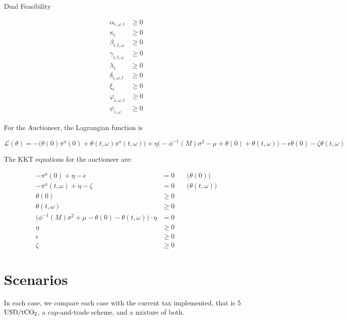 \documentclass[11pt, letterpaper]{article}
\begin{document}
\begin{flushleft}
Dual Feasibility
\end{flushleft}

\begin{align}
    \alpha_{i,\omega,t} & \geq 0 \\
    \kappa_i & \geq 0 \\
    \beta_{i,t,\omega} & \geq 0 \\
    \gamma_{i,t,\omega} & \geq 0 \\
    \lambda_i & \geq 0 \\
    \delta_{i,\omega,t} & \geq 0 \\
    \xi_i & \geq 0 \\
    \varphi_{i,\omega,t} & \geq 0 \\
    \psi_{i,\omega} & \geq 0
\end{align}

For the Auctioneer, the Lagrangian function is 

\begin{equation}
    \mathcal{L}(\theta)=  -\Big(\theta(0)\pi^a(0)+\theta(t,\omega) \pi^{a}(t,\omega)\Big) + \eta \big(-\phi^{-1}(M) \sigma^2 - \mu + \theta(0)+\theta(t,\omega)\big) - \epsilon \theta(0)-\zeta \theta(t,\omega)
\end{equation}

The KKT equations for the auctioneer are:

\begin{align}
    -\pi^{a}(0) +\eta -\epsilon & = 0 & \quad \big(\theta(0)\big)\\
    -\pi^a(t,\omega)+\eta-\zeta & = 0 & \quad \big(\theta(t,\omega)\big)\\
    \theta(0) & \geq  0 \\
    \theta(t,\omega) & \geq  0 \\
    \Big(\phi^{-1}(M) \sigma^2 + \mu - \theta(0)-\theta(t,\omega)\Big)\cdot \eta & =  0\\
    \eta & \geq  0\\
    \epsilon & \geq 0 \\
    \zeta & \geq 0
\end{align}

\section{Scenarios}
In each case, we compare each case with the current tax implemented, that is 5 $\rm USD/tCO_2$, a cap-and-trade scheme, and a mixture of both. 
\end{document}

